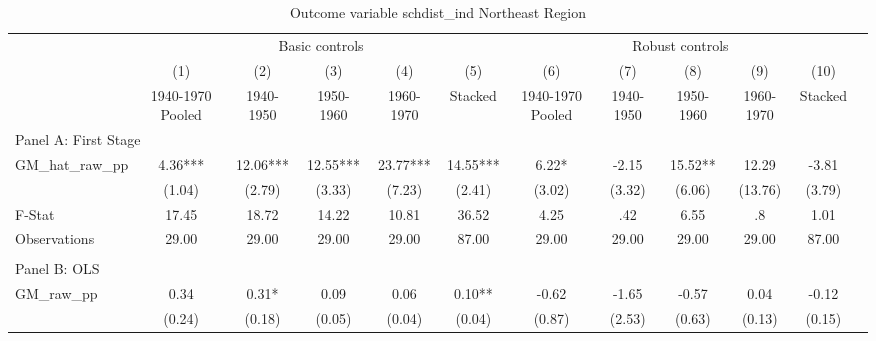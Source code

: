  \begin{table}[htbp]\centering {} \begin{threeparttable} \caption{Outcome variable schdist\_ind Northeast Region} \begin{tabular}{l*{11}{c}} \toprule
          &\multicolumn{5}{c}{Basic controls}                                   &\multicolumn{5}{c}{Robust controls}                                  \\\cmidrule(lr){2-6}\cmidrule(lr){7-11}
          &\multicolumn{1}{c}{(1)}&\multicolumn{1}{c}{(2)}&\multicolumn{1}{c}{(3)}&\multicolumn{1}{c}{(4)}&\multicolumn{1}{c}{(5)}&\multicolumn{1}{c}{(6)}&\multicolumn{1}{c}{(7)}&\multicolumn{1}{c}{(8)}&\multicolumn{1}{c}{(9)}&\multicolumn{1}{c}{(10)}\\
          &\multicolumn{1}{c}{1940-1970 Pooled}&\multicolumn{1}{c}{1940-1950}&\multicolumn{1}{c}{1950-1960}&\multicolumn{1}{c}{1960-1970}&\multicolumn{1}{c}{Stacked}&\multicolumn{1}{c}{1940-1970 Pooled}&\multicolumn{1}{c}{1940-1950}&\multicolumn{1}{c}{1950-1960}&\multicolumn{1}{c}{1960-1970}&\multicolumn{1}{c}{Stacked}\\
\cmidrule(lr){1-11}
\multicolumn{10}{l}{Panel A: First Stage}\\
\cmidrule(lr){1-11}
GM\_hat\_raw\_pp&      4.36***&     12.06***&     12.55***&     23.77***&     14.55***&      6.22*  &     -2.15   &     15.52** &     12.29   &     -3.81   \\
          &    (1.04)   &    (2.79)   &    (3.33)   &    (7.23)   &    (2.41)   &    (3.02)   &    (3.32)   &    (6.06)   &   (13.76)   &    (3.79)   \\
\midrule
F-Stat    &     17.45   &     18.72   &     14.22   &     10.81   &     36.52   &      4.25   &       .42   &      6.55   &        .8   &      1.01   \\
Observations&     29.00   &     29.00   &     29.00   &     29.00   &     87.00   &     29.00   &     29.00   &     29.00   &     29.00   &     87.00   \\
\cmidrule[\heavyrulewidth](lr){1-11} \\ \cmidrule[\heavyrulewidth](lr){1-11}
\multicolumn{10}{l}{Panel B: OLS}\\
\cmidrule(lr){1-11}
GM\_raw\_pp &      0.34   &      0.31*  &      0.09   &      0.06   &      0.10** &     -0.62   &     -1.65   &     -0.57   &      0.04   &     -0.12   \\
          &    (0.24)   &    (0.18)   &    (0.05)   &    (0.04)   &    (0.04)   &    (0.87)   &    (2.53)   &    (0.63)   &    (0.13)   &    (0.15)   \\

\end{tabular}
\end{threeparttable}
\end{table}
